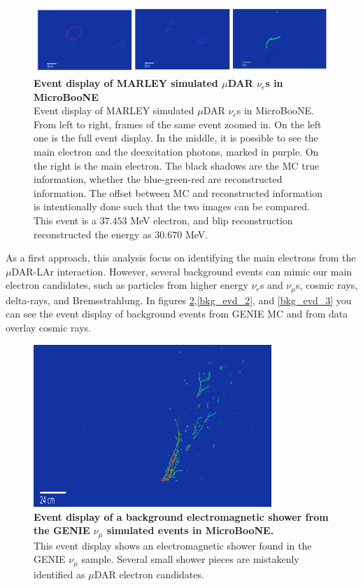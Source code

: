 \begin{figure}[h!]
    \centering
    \includegraphics[width=\textwidth]{Figures/signal_evd_3.jpeg}
    \caption[Event display of MARLEY simulated $\mu$DAR $\nu_e$s in MicroBooNE]{{\textbf{Event display of MARLEY simulated $\mu$DAR $\nu_e$s in MicroBooNE}}\\ Event display of MARLEY simulated $\mu$DAR $\nu_e$s in MicroBooNE. From left to right, frames of the same event zoomed in. On the left one is the full event display. In the middle, it is possible to see the main electron and the deexcitation photons, marked in purple. On the right is the main electron. The black shadows are the MC true information, whether the blue-green-red are reconstructed information. The offset between MC and reconstructed information is intentionally done such that the two images can be compared. This event is a $37.453$ MeV electron, and blip reconstruction reconstructed the energy as $30.670$ MeV.}
 \label{signal_evd_3}
\end{figure}


As a first approach, this analysis focus on identifying the main electrons from the $\mu$DAR-LAr interaction. However, several background events can mimic our main electron candidates, such as particles from higher energy $\nu_e$s and $\nu_{\mu}$s, cosmic rays, delta-rays, and Bremsstrahlung. In figures \ref{bkg_evd_1},\ref{bkg_evd_2}, and \ref{bkg_evd_3} you can see the event display of background events from GENIE MC and from data overlay cosmic rays.

\begin{figure}[h!]
    \centering
    \includegraphics[width=90mm]{Figures/shower_evd_1.png}
    \caption[Event display of a background electromagnetic shower from the GENIE $\nu_{\mu}$ simulated events in MicroBooNE.]{{\textbf{Event display of a background electromagnetic shower from the GENIE $\nu_{\mu}$ simulated events in MicroBooNE.}}\\ This event display shows an electromagnetic shower found in the GENIE $\nu_{\mu}$ sample. Several small shower pieces are mistakenly identified as $\mu$DAR electron candidates.}
    \label{bkg_evd_1}
\end{figure}


